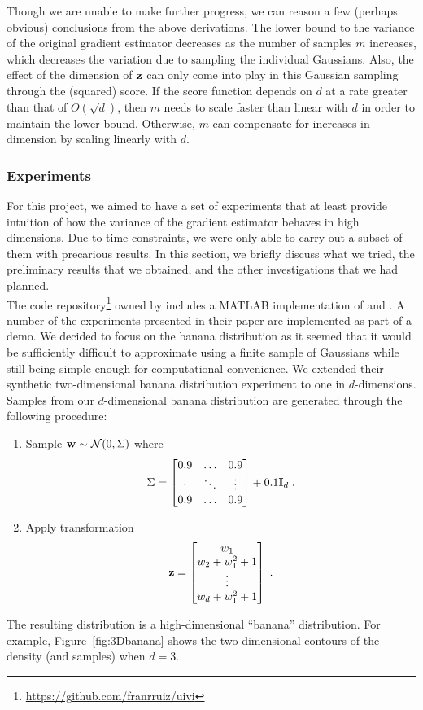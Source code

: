 \documentclass[10pt]{article}
\begin{document}
Though we are unable to make further progress, we can reason a few (perhaps obvious) conclusions from the above derivations. The lower bound to the variance of the original gradient estimator decreases as the number of samples $m$ increases, which decreases the variation due to sampling the individual Gaussians. Also, the effect of the dimension of $\mathbf{z}$ can only come into play in this Gaussian sampling through the (squared) score. If the score function depends on $d$ at a rate greater than that of $O(\sqrt{d})$, then $m$ needs to scale faster than linear with $d$ in order to maintain the lower bound. Otherwise, $m$ can compensate for increases in dimension by scaling linearly with $d$.


\subsubsection{Experiments}

For this project, we aimed to have a set of experiments that at least provide intuition of how the variance of the \uivi \elbo gradient estimator behaves in high dimensions. Due to time constraints, we were only able to carry out a subset of them with precarious results. In this section, we briefly discuss what we tried, the preliminary results that we obtained, and the other investigations that we had planned.
\\

The code repository\footnote{\url{https://github.com/franrruiz/uivi}} owned by \citeauthor{Titsias:2019} includes a MATLAB implementation of \uivi and \sivi. A number of the experiments presented in their paper are implemented as part of a \uivi demo. We decided to focus on the banana distribution as it seemed that it would be sufficiently difficult to approximate using a finite sample of Gaussians while still being simple enough for computational convenience. We extended their synthetic two-dimensional banana distribution experiment to one in $d$-dimensions. Samples from our $d$-dimensional banana distribution are generated through the following procedure:
\begin{enumerate}
\item
Sample $\mathbf{w}\sim\mathcal{N}(0,\Sigma)$ where
\[
\Sigma =
\begin{bmatrix}
0.9 & \ldots & 0.9 \\
\vdots & \ddots & \vdots \\
0.9 & \ldots & 0.9
\end{bmatrix}
+ 0.1\mathbf{I}_d \;.
\]
\item
Apply transformation
\[
\mathbf{z} = \begin{bmatrix}
w_1 \\
w_2 + w_1^2 + 1 \\
\vdots \\
w_d + w_1^2 + 1
\end{bmatrix} \;.
\]
\end{enumerate}
The resulting distribution is a high-dimensional ``banana'' distribution. For example, Figure~\ref{fig:3Dbanana} shows the two-dimensional contours of the density (and samples) when $d=3$.
\\
\end{document}
